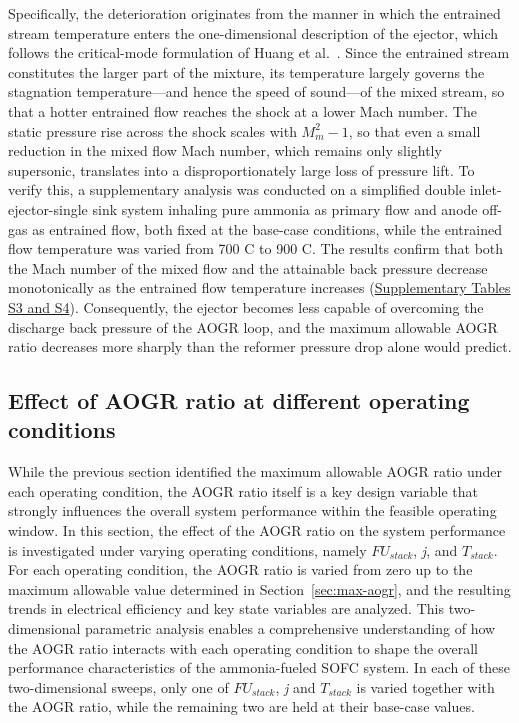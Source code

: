 \documentclass[a4paper,10pt]{cas-dc} %
\begin{document}
Specifically, the deterioration originates from the manner in which the entrained stream temperature enters the one-dimensional description of the ejector, which follows the critical-mode formulation of Huang et al.~\cite{HUANG1999354}.
Since the entrained stream constitutes the larger part of the mixture, its temperature largely governs the stagnation temperature---and hence the speed of sound---of the mixed stream, so that a hotter entrained flow reaches the shock at a lower Mach number.
The static pressure rise across the shock scales with \(M_{m}^{2}-1\), so that even a small reduction in the mixed flow Mach number, which remains only slightly supersonic, translates into a disproportionately large loss of pressure lift.
To verify this, a supplementary analysis was conducted on a simplified double inlet-ejector-single sink system inhaling pure ammonia as primary flow and anode off-gas as entrained flow, both fixed at the base-case conditions, while the entrained flow temperature was varied from 700 \textdegree C to 900 \textdegree C.
The results confirm that both the Mach number of the mixed flow and the attainable back pressure decrease monotonically as the entrained flow temperature increases (\href{Supplementary.pdf}{Supplementary Tables S3 and S4}).
Consequently, the ejector becomes less capable of overcoming the discharge back pressure of the AOGR loop, and the maximum allowable AOGR ratio decreases more sharply than the reformer pressure drop alone would predict.

\subsection{Effect of AOGR ratio at different operating conditions}
\label{sec:aogr-effect}

While the previous section identified the maximum allowable AOGR ratio under each operating condition, the AOGR ratio itself is a key design variable that strongly influences the overall system performance within the feasible operating window.
In this section, the effect of the AOGR ratio on the system performance is investigated under varying operating conditions, namely \({FU}_{stack}\), \emph{j}, and \(T_{stack}\).
For each operating condition, the AOGR ratio is varied from zero up to the maximum allowable value determined in Section~\ref{sec:max-aogr}, and the resulting trends in electrical efficiency and key state variables are analyzed.
This two-dimensional parametric analysis enables a comprehensive understanding of how the AOGR ratio interacts with each operating condition to shape the overall performance characteristics of the ammonia-fueled SOFC system.
In each of these two-dimensional sweeps, only one of \({FU}_{stack}\), \emph{j} and \(T_{stack}\) is varied together with the AOGR ratio, while the remaining two are held at their base-case values.
\end{document}
